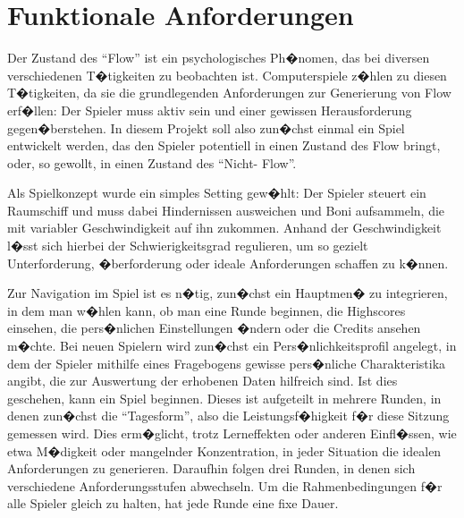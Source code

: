 \documentclass[a4paper,12pt]{scrartcl}
\begin{document}


% 
% 
% 
% 



\tableofcontents
\clearpage



\clearpage


\section{Funktionale Anforderungen}
Der Zustand des "`Flow"' ist ein psychologisches Ph�nomen, das bei diversen verschiedenen
T�tigkeiten zu beobachten ist. Computerspiele z�hlen zu diesen T�tigkeiten, da sie die
grundlegenden Anforderungen zur Generierung von Flow erf�llen: Der Spieler muss aktiv
sein und einer gewissen Herausforderung gegen�berstehen.\newline
In diesem Projekt soll also zun�chst einmal ein Spiel entwickelt werden, das den Spieler
potentiell in einen Zustand des Flow bringt, oder, so gewollt, in einen Zustand des "`Nicht-
Flow"'.

Als Spielkonzept wurde ein simples Setting gew�hlt: Der Spieler steuert ein Raumschiff
und muss dabei Hindernissen ausweichen und Boni aufsammeln, die mit variabler
Geschwindigkeit auf ihn zukommen. Anhand der Geschwindigkeit l�sst sich hierbei der
Schwierigkeitsgrad regulieren, um so gezielt Unterforderung, �berforderung oder ideale
Anforderungen schaffen zu k�nnen.

Zur Navigation im Spiel ist es n�tig, zun�chst ein Hauptmen� zu integrieren, in dem man
w�hlen kann, ob man eine Runde beginnen, die Highscores einsehen, die
pers�nlichen Einstellungen �ndern oder die Credits ansehen m�chte.\newline
Bei neuen Spielern wird zun�chst ein Pers�nlichkeitsprofil angelegt, in dem der Spieler
mithilfe eines Fragebogens gewisse pers�nliche Charakteristika angibt, die zur Auswertung
der erhobenen Daten hilfreich sind.\newline
Ist dies geschehen, kann ein Spiel beginnen. Dieses ist aufgeteilt in mehrere Runden, in
denen zun�chst die "`Tagesform"', also die Leistungsf�higkeit f�r diese Sitzung gemessen
wird. Dies erm�glicht, trotz Lerneffekten oder anderen Einfl�ssen, wie etwa M�digkeit oder
mangelnder Konzentration, in jeder Situation die idealen Anforderungen zu
generieren.\newline
Daraufhin folgen drei Runden, in denen sich verschiedene
Anforderungsstufen abwechseln. Um die Rahmenbedingungen f�r alle Spieler gleich zu halten, hat jede Runde eine fixe
Dauer.
\end{document}

